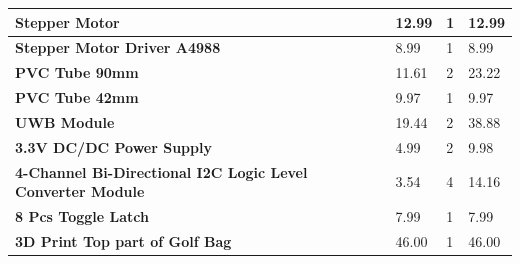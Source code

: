 \documentclass[11pt,landscape]{article}
\begin{document}
\begin{table}[H]
\begin{center}
\begin{tabular}{|l|l|l|l|}
    \textbf{Stepper Motor}                                                                     & 12.99                                         & 1                                     & 12.99                                                 \\ \hline
    \textbf{Stepper Motor Driver A4988}                                                        & 8.99                                          & 1                                     & 8.99                                                  \\ \hline
    \textbf{PVC Tube 90mm}                                                                     & 11.61                                         & 2                                     & 23.22                                                 \\ \hline
    \textbf{PVC Tube 42mm}                                                                     & 9.97                                          & 1                                     & 9.97                                                  \\ \hline
    \textbf{UWB Module}                                                                        & 19.44                                         & 2                                     & 38.88                                                 \\ \hline
    \textbf{3.3V DC/DC Power Supply}                                                           & 4.99                                          & 2                                     & 9.98                                                  \\ \hline
    \textbf{4-Channel Bi-Directional I2C Logic Level Converter Module}                         & 3.54                                          & 4                                     & 14.16                                                 \\ \hline
    \textbf{8 Pcs Toggle Latch}                                                                & 7.99                                          & 1                                     & 7.99                                                  \\ \hline
    \textbf{3D Print Top part of Golf Bag}                                                     & 46.00                                         & 1                                     & 46.00                                                 \\ \hline

\end{tabular}
\end{center}
\end{table}
\end{document}
